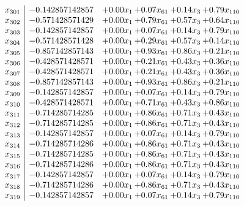 \documentclass[8pt]{article}
\begin{document}
\[\begin{array}{c| c c@{\hskip 2pt} c@{\hskip 2pt} c@{\hskip 2pt} c@{\hskip 2pt} }
 x_{301}   &  -0.142857142857 & +  0.00 x_{1} & +  0.07 x_{61} & +  0.14 x_{3} & +  0.79 x_{110}\\
 x_{302}   &  -0.571428571429 & +  0.00 x_{1} & +  0.79 x_{61} & +  0.57 x_{3} & +  0.64 x_{110}\\
 x_{303}   &  -0.142857142857 & +  0.00 x_{1} & +  0.07 x_{61} & +  0.14 x_{3} & +  0.79 x_{110}\\
 x_{304}   &  -0.571428571428 & +  0.00 x_{1} & +  0.29 x_{61} & +  0.57 x_{3} & +  0.14 x_{110}\\
 x_{305}   &  -0.857142857143 & +  0.00 x_{1} & +  0.93 x_{61} & +  0.86 x_{3} & +  0.21 x_{110}\\
 x_{306}   &  -0.428571428571 & +  0.00 x_{1} & +  0.21 x_{61} & +  0.43 x_{3} & +  0.36 x_{110}\\
 x_{307}   &  -0.428571428571 & +  0.00 x_{1} & +  0.21 x_{61} & +  0.43 x_{3} & +  0.36 x_{110}\\
 x_{308}   &  -0.857142857143 & +  0.00 x_{1} & +  0.93 x_{61} & +  0.86 x_{3} & +  0.21 x_{110}\\
 x_{309}   &  -0.142857142857 & +  0.00 x_{1} & +  0.07 x_{61} & +  0.14 x_{3} & +  0.79 x_{110}\\
 x_{310}   &  -0.428571428571 & +  0.00 x_{1} & +  0.71 x_{61} & +  0.43 x_{3} & +  0.86 x_{110}\\
 x_{311}   &  -0.714285714285 & +  0.00 x_{1} & +  0.86 x_{61} & +  0.71 x_{3} & +  0.43 x_{110}\\
 x_{312}   &  -0.714285714285 & +  0.00 x_{1} & +  0.86 x_{61} & +  0.71 x_{3} & +  0.43 x_{110}\\
 x_{313}   &  -0.142857142857 & +  0.00 x_{1} & +  0.07 x_{61} & +  0.14 x_{3} & +  0.79 x_{110}\\
 x_{314}   &  -0.714285714286 & +  0.00 x_{1} & +  0.86 x_{61} & +  0.71 x_{3} & +  0.43 x_{110}\\
 x_{315}   &  -0.714285714285 & +  0.00 x_{1} & +  0.86 x_{61} & +  0.71 x_{3} & +  0.43 x_{110}\\
 x_{316}   &  -0.714285714286 & +  0.00 x_{1} & +  0.86 x_{61} & +  0.71 x_{3} & +  0.43 x_{110}\\
 x_{317}   &  -0.142857142857 & +  0.00 x_{1} & +  0.07 x_{61} & +  0.14 x_{3} & +  0.79 x_{110}\\
 x_{318}   &  -0.714285714286 & +  0.00 x_{1} & +  0.86 x_{61} & +  0.71 x_{3} & +  0.43 x_{110}\\
 x_{319}   &  -0.142857142857 & +  0.00 x_{1} & +  0.07 x_{61} & +  0.14 x_{3} & +  0.79 x_{110}\\

\end{array}\]
\end{document}
